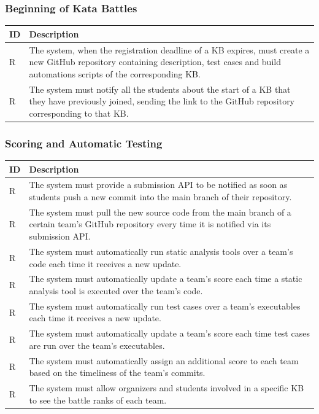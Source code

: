 \documentclass[11pt]{report}
\newcounter{rcounter}
\newcommand{\rc}{
    \addtocounter{rcounter}{1}
    R\arabic{rcounter}
}
\begin{document}
\subsubsection*{Beginning of Kata Battles}

\begin{longtable}[h] {|p{10mm}|p{130mm}|}
\hline
\rowcolor{gray!20}
\textbf{ID} & \textbf{Description} \\ \hline
    \rc & The system, when the registration deadline of a KB expires, must create a new GitHub repository containing description, test cases and build automations scripts of the corresponding KB\@.
    \\ \hline
    \rc & The system must notify all the students about the start of a KB that they have previously joined, sending the link to the GitHub repository corresponding to that KB\@.
    \\ \hline
\end{longtable}

\newpage
\subsubsection*{Scoring and Automatic Testing}

\begin{longtable}[h] {|p{10mm}|p{130mm}|}
\hline
\rowcolor{gray!20}
\textbf{ID} & \textbf{Description} \\ \hline
    \rc & The system must provide a submission API to be notified as soon as students push a new commit into the main branch of their repository.
    \\ \hline
    \rc & The system must pull the new source code from the main branch of a certain team's GitHub repository every time it is notified via its submission API\@.
    \\ \hline
    \rc & The system must automatically run static analysis tools over a team’s code each time it receives a new update.
    \\ \hline
    \rc & The system must automatically update a team’s score each time a static analysis tool is executed over the team's code.
    \\ \hline
    \rc & The system must automatically run test cases over a team’s executables each time it receives a new update.
    \\ \hline
    \rc & The system must automatically update a team’s score each time test cases are run over the team's executables.
    \\ \hline
    \rc & The system must automatically assign an additional score to each team based on the timeliness of the team's commits.
    \\ \hline
    \rc & The system must allow organizers and students involved in a specific KB to see the battle ranks of each team.
    \\ \hline
\end{longtable}
\end{document}
